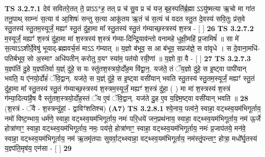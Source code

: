 \documentclass[17pt]{extarticle}
\begin{document}
                                        \textbf{ TS 3.2.7.1} \newline
                  देव॑ सवितरे॒तत् ते॒ प्राऽऽ*ह॒ तत् प्र च॑ सु॒व प्र च॑ यज॒ बृह॒स्पति॑र्ब्र॒ह्मा ऽऽयु॑ष्मत्या ऋ॒चो मा गा॑त तनू॒पाथ् साम्नः॑ स॒त्या व॑ आ॒शिषः॑ सन्तु स॒त्या आकू॑तय ऋ॒तं च॑ स॒त्यं च॑ वदत स्तु॒त दे॒वस्य॑ सवि॒तुः प्र॑स॒वे स्तु॒तस्य॑ स्तु॒तम॒स्यूर्जं॒ मह्यꣳ॑ स्तु॒तं दु॑हा॒मा मा᳚ स्तु॒तस्य॑ स्तु॒तं ग॑म्याच्छ॒स्त्रस्य॑ श॒स्त्र - [  ] \textbf{  26} \newline
                  \newline
                                \textbf{ TS 3.2.7.2} \newline
                  म॒स्यूर्जं॒ मह्यꣳ॑ श॒स्त्रं दु॑हा॒मा मा॑ श॒स्त्रस्य॑ श॒स्त्रं ग॑म्या-दिन्द्रि॒याव॑न्तो वनामहे धुक्षी॒महि॑ प्र॒जामिषं᳚ ॥ सा मे॑ स॒त्याऽऽशीर्दे॒वेषु॑ भूयाद्-ब्रह्मवर्च॒सं माऽऽ ग॑म्यात् ॥ य॒ज्ञो ब॑भूव॒ स आ ब॑भूव॒ सप्रज॑ज्ञे॒ स वा॑वृधे । स दे॒वाना॒मधि॑-पतिर्बभूव॒ सो अ॒स्माꣳ अधि॑पतीन् करोतु व॒यꣳ स्या॑म॒ पत॑यो रयी॒णां ॥ य॒ज्ञो वा॒ वै - [  ] \textbf{  27} \newline
                  \newline
                                \textbf{ TS 3.2.7.3} \newline
                  य॒ज्ञ्प॑तिं दु॒हे य॒ज्ञ्प॑तिर्वा य॒ज्ञ्ं दु॑हे॒ स यः स्तु॑तश॒स्त्रयो॒र्दोह॒म वि॑द्वा॒न॒. यज॑ते॒ तं ॅय॒ज्ञो दु॑हे॒ स इ॒ष्ट्वा पापी॑यान् भवति॒ य ए॑नयो॒र्दोहं॑ ॅवि॒द्वान्. यज॑ते॒ स य॒ज्ञ्ं दु॑हे॒ स इ॒ष्ट्वा वसी॑यान् भवति स्तु॒तस्य॑ स्तु॒तम॒स्यूर्जं॒ मह्यꣳ॑ स्तु॒तं दु॑हा॒मा मा᳚ स्तु॒तस्य॑ स्तु॒तं ग॑म्याच्छ॒स्त्रस्य॑ श॒स्त्रम॒स्यूर्जं॒ मह्यꣳ॑ श॒स्त्रं दु॑हा॒ ( ) मा मा॑ श॒स्त्रस्य॑ श॒स्त्रं ग॑म्या॒दित्या॑है॒ष वै स्तु॑तश॒स्त्रयो॒र्दोह॒स्तं ॅय ए॒वं ॅवि॒द्वान्. यज॑ते दु॒ह ए॒व य॒ज्ञ्मि॒ष्ट्वा वसी॑यान् भवति ॥ \textbf{  28} \newline
                  \newline
                      (श॒स्त्रं - ॅवै - श॒स्त्रन्दु॑हां॒ - द्वाविꣳ॑शतिश्च)  \textbf{(A7)} \newline \newline
                                        \textbf{ TS 3.2.8.1} \newline
                  श्ये॒नाय॒ पत्व॑ने॒ स्वाहा॒ वट्थ्स्व॒यम॑भिगूर्ताय॒ नमो॑ विष्ट॒म्भाय॒ धर्म॑णे॒ स्वाहा॒ वट्थ्स्व॒यम॑भिगूर्ताय॒ नमः॑ परि॒धये॑ जन॒प्रथ॑नाय॒ स्वाहा॒ वट्थ्स्व॒यम॑भिगूर्ताय॒ नम॑ ऊ॒र्जे होत्रा॑णाꣳ॒॒ स्वाहा॒ वट्थ्स्व॒यम॑भिगूर्ताय॒ नमः॒ पय॑से॒ होत्रा॑णाꣳ॒॒ स्वाहा॒ वट्थ्स्व॒यम॑भिगूर्ताय॒ नमः॑ प्र॒जाप॑तये॒ मन॑वे॒ स्वाहा॒ वट्थ्स्व॒यम॑भिगूर्ताय॒ नम॑ ऋ॒तमृ॑तपाः सुवर्वा॒ट्थ्स्वाहा॒ वट्थ्स्व॒यम॑भिगूर्ताय॒ नम॑स्तृं॒पन्ताꣳ॒॒ होत्रा॒ मधो᳚र्घृ॒तस्य॑ य॒ज्ञ्प॑ति॒मृष॑य॒ एन॑सा - [  ] \textbf{  29} \newline
\end{document}
